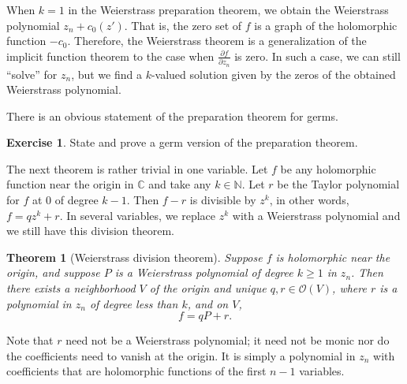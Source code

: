 \documentclass[12pt,openany]{book}
\newcommand{\C}{{\mathbb{C}}}
\newcommand{\N}{{\mathbb{N}}}
\newcommand{\sO}{{\mathscr{O}}}
\newcommand{\myindex}[1]{#1\index{#1}}
\theoremstyle{plain}
\newtheorem{thm}{Theorem}[section]
\theoremstyle{remark}
\theoremstyle{definition}
\newenvironment{exbox}{%
    \def\FrameCommand{\vrule width 1pt \relax\hspace{10pt}}%
    \MakeFramed{\advance\hsize-\width\FrameRestore}%
}{%
    \endMakeFramed
}
\theoremstyle{exercise}
\newtheorem{exercise}{Exercise}[section]
\theoremstyle{example}
\begin{document}
When $k=1$ in the Weierstrass preparation theorem, we obtain
the Weierstrass polynomial $z_n + c_0(z')$.  That is, the zero set of
$f$ is a graph of the holomorphic function $-c_0$.
Therefore, the Weierstrass theorem is a generalization of the
implicit function theorem to the case when $\frac{\partial f}{\partial z_n}$
is zero.  In such a case, we can still ``solve'' for $z_n$,
but we find a $k$-valued solution given by the zeros of the obtained Weierstrass polynomial.

There is an obvious statement of the preparation theorem for germs.

\begin{exbox}
\begin{exercise}
State and prove a germ version of the preparation theorem.
\end{exercise}
\end{exbox}

The next theorem is rather trivial in one variable.  Let $f$ be any
holomorphic function near the origin in $\C$ and take any $k \in \N$.
Let $r$ be the Taylor polynomial for $f$ at $0$ of degree $k-1$.  Then
$f-r$ is divisible by $z^k$, in other words, 
$f = q z^k + r$.
In several variables, we replace
$z^k$ with a Weierstrass polynomial and we still have this division
theorem.

\begin{thm}[\myindex{Weierstrass division theorem}]
Suppose $f$ is holomorphic near the origin, and suppose $P$
is a Weierstrass polynomial of degree $k \geq 1$ in $z_n$.  Then there exists
a neighborhood $V$ of the origin and unique $q,r \in \sO(V)$,
where $r$ is a polynomial in $z_n$ of degree less than $k$, and on $V$,
\begin{equation*}
f = qP + r .
\end{equation*}
\end{thm}

Note that $r$ need not be a Weierstrass polynomial; it need not be monic
nor do the coefficients need to vanish at the origin.  It is simply a
polynomial in $z_n$ with coefficients that are holomorphic functions
of the first $n-1$ variables.
\end{document}
